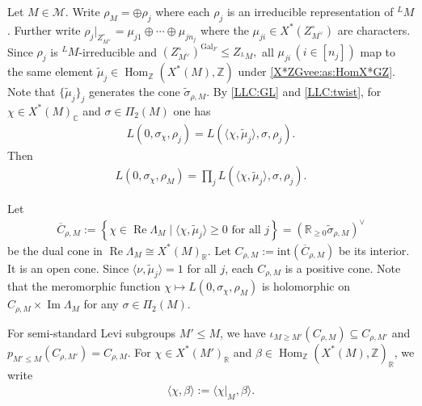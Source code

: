 \documentclass[10pt]{amsart}
\theoremstyle{definition}
\numberwithin{equation}{section}
\DeclareMathOperator{\Hom}{\mathrm{Hom}}
\DeclareMathOperator{\Gal}{\mathrm{Gal}}
\numberwithin{equation}{subsection}
\newcommand{\ZZ}{\mathbb{Z}}
\newcommand{\RR}{\mathbb{R}}
\renewcommand{\Im}{\mathop{\mathrm{Im}}}
\renewcommand{\Re}{\mathop{\mathrm{Re}}}
\begin{document}
 Let $M\in \mathcal{M}$. Write $\rho_{M} = \oplus \rho_j$ where each $\rho_j$ is an irreducible representation of $^LM$. Further write $\rho_j\vert_{Z_{M^\vee}^\circ} = \mu_{j1}\oplus\cdots\oplus\mu_{jn_j}$ where the $\mu_{ji}\in X^*(Z^\circ_{M^\vee})$ are characters. Since $\rho_j$ is $^LM$-irreducible and $(Z^\circ_{M^\vee})^{\Gal_F}\le  Z_{{}^LM},$ all $\mu_{ji}\,(i\in[n_j])$ map to the same element $\widetilde{\mu}_j\in\Hom_\mathbb{Z}(X^*(M),\mathbb{Z})$ under \eqref{X*ZGvee:as:HomX*GZ}. Note that $\{\widetilde{\mu}_j\}_{j}$ generates the cone $\widetilde{\sigma}_{\rho,M}$. By \eqref{LLC:GL} and \eqref{LLC:twist}, for $\chi\in X^*(M)_{\mathbb{C}}$ and $\sigma\in \Pi_2(M)$ one has
\begin{align*}
L(0,\sigma_\chi,\rho_j) = L(\langle\chi,\widetilde{\mu}_j\rangle,\sigma,\rho_j).
\end{align*}
Then 
\begin{align}\label{Lfactor:factorize}
    L(0,\sigma_\chi,\rho_{M}) = \prod_{j}L( \langle\chi,\widetilde{\mu}_j\rangle,\sigma,\rho_j).
\end{align}

Let
\begin{align}\label{CrhoM:dualcone:defn}
    \overline{C}_{\rho,M} := \left\{\chi\in \Re \Lambda_M\mid \langle\chi,\widetilde{\mu}_j\rangle \ge  0 \textrm{ for all } j\right\} = \left(\RR_{\ge 0}\widetilde{\sigma}_{\rho,M}\right)^\vee
\end{align} 
be the dual cone in $\Re\Lambda_M\cong X^\ast(M)_\RR.$ Let $C_{\rho,M}:=\mathrm{int}(\overline{C}_{\rho,M})$ be its interior. It is an open cone. Since $\langle \nu,\widetilde{\mu}_j\rangle=1$ for all $j$, each $C_{\rho,M}$ is a positive cone. Note that the meromorphic function $\chi\mapsto L(0,\sigma_{\chi}, \rho_{M})$ is holomorphic on $C_{\rho,M}\times \Im \Lambda_M$ for any $\sigma\in \Pi_2(M)$. 

For semi-standard Levi subgroups $M'\leq M$, we have $\iota_{M\ge M'}(C_{\rho,M})\subseteq C_{\rho,M'}$ and $p_{M'\le M}(C_{\rho,M'})=C_{\rho,M}.$ For $\chi\in X^*(M')_\RR$ and $\beta\in\Hom_\ZZ(X^*(M),\ZZ)_\RR$, we write
\begin{align}\label{pairing:bw:Levis}
    \langle \chi,\beta\rangle := \langle \chi|_{M},\beta\rangle.
\end{align}
\end{document}
